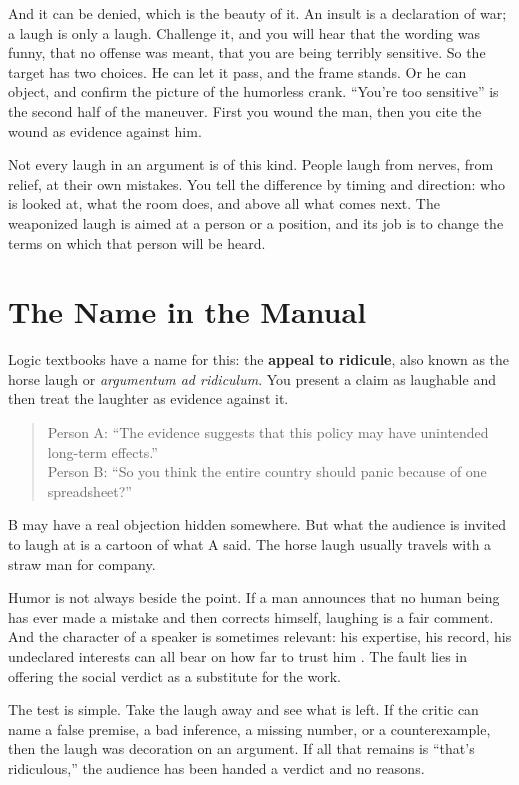 \documentclass[12pt,a4paper]{book}
\begin{document}
And it can be denied, which is the beauty of it. An insult is a declaration of war; a laugh is only a laugh. Challenge it, and you will hear that the wording was funny, that no offense was meant, that you are being terribly sensitive. So the target has two choices. He can let it pass, and the frame stands. Or he can object, and confirm the picture of the humorless crank. ``You're too sensitive'' is the second half of the maneuver. First you wound the man, then you cite the wound as evidence against him.

Not every laugh in an argument is of this kind. People laugh from nerves, from relief, at their own mistakes. You tell the difference by timing and direction: who is looked at, what the room does, and above all what comes next. The weaponized laugh is aimed at a person or a position, and its job is to change the terms on which that person will be heard.

\section{The Name in the Manual}

Logic textbooks have a name for this: the \textbf{appeal to ridicule}, also known as the horse laugh or \emph{argumentum ad ridiculum}. You present a claim as laughable and then treat the laughter as evidence against it.

\begin{quote}
Person A: ``The evidence suggests that this policy may have unintended long-term effects.''\\
Person B: ``So you think the entire country should panic because of one spreadsheet?''
\end{quote}

B may have a real objection hidden somewhere. But what the audience is invited to laugh at is a cartoon of what A said. The horse laugh usually travels with a straw man for company.

Humor is not always beside the point. If a man announces that no human being has ever made a mistake and then corrects himself, laughing is a fair comment. And the character of a speaker is sometimes relevant: his expertise, his record, his undeclared interests can all bear on how far to trust him \cite{walton1998}. The fault lies in offering the social verdict as a substitute for the work.

The test is simple. Take the laugh away and see what is left. If the critic can name a false premise, a bad inference, a missing number, or a counterexample, then the laugh was decoration on an argument. If all that remains is ``that's ridiculous,'' the audience has been handed a verdict and no reasons.
\end{document}
